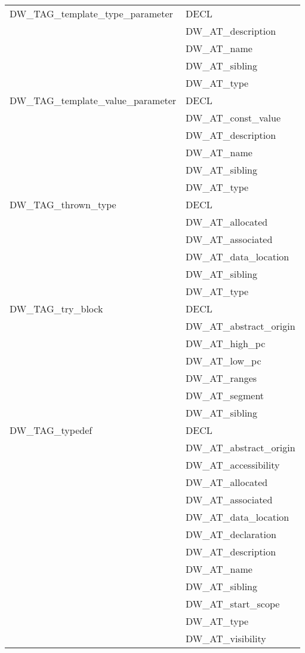 \begin{longtable}{l|p{8cm}}
DW\_TAG\_template\_type\_parameter
&DECL   \\
&DW\_AT\_description   \\
&DW\_AT\_name   \\
&DW\_AT\_sibling   \\
&DW\_AT\_type   \\

DW\_TAG\_template\_value\_parameter 
&DECL   \\
&DW\_AT\_const\_value   \\
&DW\_AT\_description   \\
&DW\_AT\_name   \\
&DW\_AT\_sibling   \\
&DW\_AT\_type   \\


DW\_TAG\_thrown\_type
&DECL   \\
&DW\_AT\_allocated   \\
&DW\_AT\_associated   \\
&DW\_AT\_data\_location   \\
&DW\_AT\_sibling   \\
&DW\_AT\_type   \\

DW\_TAG\_try\_block
&DECL   \\
&DW\_AT\_abstract\_origin   \\
&DW\_AT\_high\_pc   \\
&DW\_AT\_low\_pc   \\
&DW\_AT\_ranges   \\
&DW\_AT\_segment   \\
&DW\_AT\_sibling   \\

DW\_TAG\_typedef
&DECL   \\
&DW\_AT\_abstract\_origin   \\
&DW\_AT\_accessibility   \\
&DW\_AT\_allocated   \\
&DW\_AT\_associated   \\
&DW\_AT\_data\_location   \\
&DW\_AT\_declaration   \\
&DW\_AT\_description   \\
&DW\_AT\_name   \\
&DW\_AT\_sibling   \\
&DW\_AT\_start\_scope   \\
&DW\_AT\_type   \\
&DW\_AT\_visibility   \\


\end{longtable}
